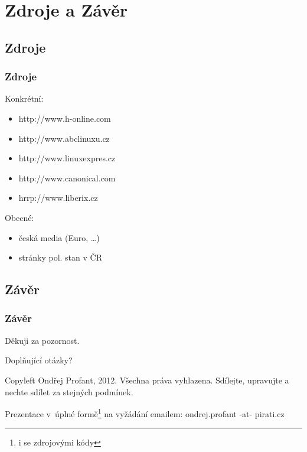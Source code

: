 \documentclass[12pt]{beamer}
\begin{document}
%

\section{Zdroje a Závěr}
\subsection{Zdroje}
\begin{frame}
  \frametitle{Zdroje}
  Konkrétní:
  \begin{itemize}
   \item http://www.h-online.com
   \item http://www.abclinuxu.cz
   \item http://www.linuxexpres.cz	
   \item http://www.canonical.com
   \item hrrp://www.liberix.cz
  \end{itemize}
  Obecné:
  \begin{itemize}
   \item česká media (Euro, \ldots{})
   \item stránky pol. stan v ČR
  \end{itemize}
\end{frame}

\subsection{Závěr}
\begin{frame}
  \frametitle{Závěr}
	Děkuji za pozornost.

	\bigskip
	
	Doplňující otázky?

\bigskip

\bigskip

\scriptsize
Copyleft Ondřej Profant, 2012. Všechna práva vyhlazena. Sdílejte, upravujte a nechte sdílet za stejných podmínek. 

Prezentace v~úplné formě\footnote{i se zdrojovými kódy} na vyžádání emailem: ondrej.profant -at- pirati.cz 
\end{frame}
\end{document}
